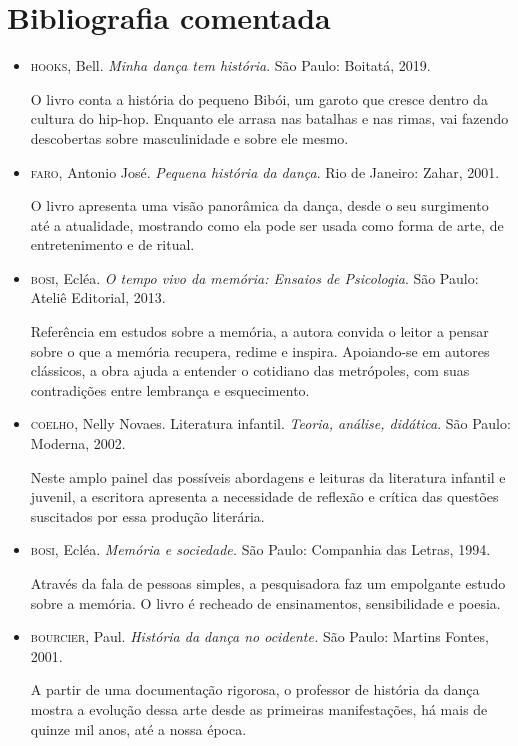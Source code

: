 \documentclass[12pt]{extarticle}
\begin{document}
\section{Bibliografia comentada}

\begin{itemize}


\item \textsc{hooks}, Bell. \emph{Minha dança tem história}. São Paulo:
  Boitatá, 2019.

O livro conta a história do pequeno Bibói, um garoto que cresce dentro
  da cultura do hip-hop. Enquanto ele arrasa nas batalhas e nas rimas, vai
  fazendo descobertas sobre masculinidade e sobre ele mesmo.

\item \textsc{faro}, Antonio José. \emph{Pequena história da dança}. Rio de Janeiro: Zahar,
  2001.

O livro apresenta uma visão panorâmica da dança, desde o seu surgimento
  até a atualidade, mostrando como ela pode ser usada como forma de arte, de
  entretenimento e de ritual.

\item \textsc{bosi}, Ecléa. \emph{O tempo vivo da memória: Ensaios de Psicologia}. São Paulo:
  Ateliê Editorial, 2013.

Referência em estudos sobre a memória, a autora convida o leitor a
  pensar sobre o que a memória recupera, redime e inspira. Apoiando-se em
  autores clássicos, a obra ajuda a entender o cotidiano das metrópoles, com
  suas contradições entre lembrança e esquecimento. 

\item  
\textsc{coelho}, Nelly Novaes. Literatura infantil. \emph{Teoria,
análise, didática}. São Paulo: Moderna, 2002.

Neste amplo painel das possíveis abordagens e leituras da literatura
infantil e juvenil, a escritora apresenta a necessidade de reflexão e crítica
das questões suscitados por essa produção literária.

\item
\textsc{bosi}, Ecléa. \emph{Memória e sociedade.} São Paulo: Companhia
das Letras, 1994.

Através da fala de pessoas simples, a pesquisadora faz um empolgante
estudo sobre a memória. O livro é recheado de ensinamentos, sensibilidade e
poesia.

\item
\textsc{bourcier}, Paul. \emph{História da dança no ocidente.} São Paulo:
Martins Fontes, 2001. 

A partir de uma documentação rigorosa, o professor de história da dança
mostra a evolução dessa arte desde as primeiras manifestações, há mais de
quinze mil anos, até a nossa época.

\end{itemize}
\end{document}
